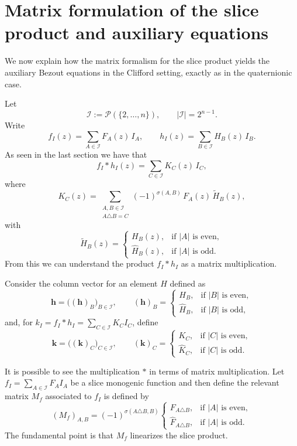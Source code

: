 \documentclass[11pt]{amsart}
\begin{document}


\section{Matrix formulation of the slice product and auxiliary equations}
\label{subsec:matrix-clifford-aux}

We now explain how the matrix formalism for the slice product yields the auxiliary Bezout equations in the Clifford setting, exactly as in the quaternionic case.

Let
$$
\mathcal I:=\mathcal P(\{2,\dots,n\}),
\qquad
|\mathcal I|=2^{n-1}.
$$
Write
$$
f_I(z)=\sum_{A\in\mathcal I}F_A(z)\,I_A,
\qquad
h_I(z)=\sum_{B\in\mathcal I}H_B(z)\,I_B.
$$
As seen in the last section we have that
$$
f_I*h_I(z)=\sum_{C\in\mathcal I}K_C(z)\,I_C,
$$
where
\begin{equation}
\label{eq:product-matrix-section}
K_C(z)=\sum_{\substack{A,B\in\mathcal I\\ A\triangle B=C}}
(-1)^{\sigma(A,B)}\,F_A(z)\,\widetilde H_B(z),
\end{equation}
with
$$
\widetilde H_B(z)=
\begin{cases}
H_B(z), & \text{if } |A| \text{ is even},\\
\hat{H}_B(z), & \text{if } |A| \text{ is odd}.
\end{cases}
$$
From this we can understand the product $f_I\ast h_I$ as a matrix multiplication.

Consider the column vector for an element $H$ defined as
$$
\mathbf h=\bigl((\mathbf h)_B\bigr)_{B\in\mathcal I},
\qquad
(\mathbf h)_B=
\begin{cases}
H_B, & \text{if } |B| \text{ is even},\\
\hat{H}_B, & \text{if } |B| \text{ is odd},
\end{cases}
$$
and, for $\displaystyle k_I=f_I*h_I=\sum_{C\in\mathcal I}K_C I_C$, define
$$
\mathbf k=\bigl((\mathbf k)_C\bigr)_{C\in\mathcal I},
\qquad
(\mathbf k)_C=
\begin{cases}
K_C, & \text{if } |C| \text{ is even},\\
\hat{K}_C, & \text{if } |C| \text{ is odd}.
\end{cases}
$$

It is possible to see the multiplication $\ast$ in terms of matrix multiplication.  Let $\displaystyle f_I = \sum_{A\in\mathcal{I}} F_A I_A$ be a slice monogenic function and then define the relevant matrix $M_f$ associated to $f_I$ is defined by
\begin{equation}
\label{eq:Mf-matrix-section}
(M_f)_{A,B}
=
(-1)^{\sigma(A\triangle B,B)}
\begin{cases}
F_{A\triangle B}, & \text{if } |A| \text{ is even},\\
\hat{F}_{A\triangle B}, & \text{if } |A| \text{ is odd}.
\end{cases}
\end{equation}
The fundamental point is that $M_f$ linearizes the slice product.
\end{document}
